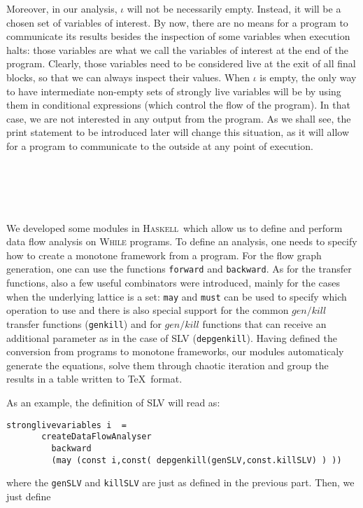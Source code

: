\documentclass[a4wide,12pt]{article}
\def\haskell{\textsc{Haskell}}
\def\hs#1{\texttt{#1}}
\begin{document}
Moreover, in our analysis, $\iota$ will not be necessarily empty. Instead, it will be a chosen set of
variables of interest.
By now, there are no means for a program
to communicate its results besides the inspection of some variables when execution halts: those variables
are what we call the variables of interest at the end of the program. Clearly,
those variables need to be considered live at the exit of all final blocks, so that we can always inspect their values.
When $\iota$ is empty, the only way to have intermediate
non-empty sets of strongly live variables will be by using them in conditional expressions (which control the
flow of the program). In that case, we are not interested in any output from the program.
As we shall see, the print statement
to be introduced later will change this situation, as it will allow for
a program to communicate to the outside at any point of execution. 
 
\section{~}
 
We developed some modules in \haskell\ which allow us to define and perform
data flow analysis on \textsc{While} programs. To define an analysis,
one needs to specify how to create a monotone framework from a program.
For the flow graph generation, one can use the functions \hs{forward} and \hs{backward}.
As for the transfer functions, also a few useful combinators were introduced, mainly
for the cases when the underlying lattice is a set: \hs{may} and \hs{must}
can be used to specify which operation to use and there is also special support
for the common $gen/kill$ transfer functions (\hs{genkill}) and for
$gen/kill$ functions that can receive an additional parameter as in the case of SLV
(\hs{depgenkill}). Having defined the conversion from programs to monotone frameworks,
our modules automaticaly generate the equations, solve them through chaotic iteration
and group the results in a table written to \TeX\ format. 

As an example, the definition of SLV will read as:

{\small
\begin{verbatim}
stronglivevariables i  =
       createDataFlowAnalyser
         backward
         (may (const i,const( depgenkill(genSLV,const.killSLV) ) ))
\end{verbatim}
}

\noindent
where the \hs{genSLV} and \hs{killSLV} are just as defined in the previous part. Then, we just define
\end{document}
